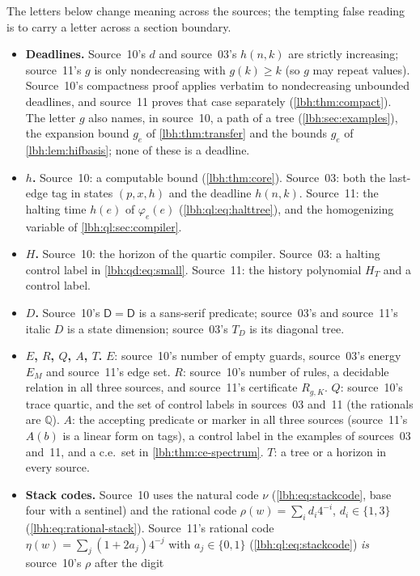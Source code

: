 \documentclass[11pt,letterpaper]{article}
\theoremstyle{definition}
\theoremstyle{remark}
\newcommand{\Q}{\mathbb Q}
\newcommand{\Fixed}{\mathsf{D}}
\newcommand{\1}{\mathbf 1}
\begin{document}
The letters below change meaning across the sources; the tempting false reading is to carry a
letter across a section boundary.
\begin{itemize}
\item \textbf{Deadlines.} Source~10's $d$ and source~03's $h(n,k)$ are strictly increasing;
source~11's $g$ is only nondecreasing with $g(k)\ge k$ (so $g$ may repeat values). Source~10's
compactness proof applies verbatim to nondecreasing unbounded deadlines, and source~11 proves
that case separately (\cref{lbh:thm:compact}). The letter $g$ also names, in source~10, a path of
a tree (\cref{lbh:sec:examples}), the expansion bound $g_e$ of \cref{lbh:thm:transfer} and the
bounds $g_e$ of \cref{lbh:lem:hifbasis}; none of these is a deadline.
\item \textbf{$h$.} Source~10: a computable bound (\cref{lbh:thm:core}). Source~03: both the
last-edge tag in states $(p,x,h)$ and the deadline $h(n,k)$. Source~11: the halting time
$h(e)$ of $\varphi_e(e)$ (\cref{lbh:ql:eq:halttree}), and the homogenizing variable of
\cref{lbh:ql:sec:compiler}.
\item \textbf{$H$.} Source~10: the horizon of the quartic compiler. Source~03: a halting control
label in \cref{lbh:qd:eq:small}. Source~11: the history polynomial $H_T$ and a control label.
\item \textbf{$D$.} Source~10's $\Fixed=\mathsf D$ is a sans-serif predicate; source~03's and
source~11's italic $D$ is a state dimension; source~03's $T_D$ is its diagonal tree.
\item \textbf{$E$, $R$, $Q$, $A$, $T$.} $E$: source~10's number of empty guards, source~03's energy
$E_M$ and source~11's edge set. $R$: source~10's number of rules, a decidable relation in all
three sources, and source~11's certificate $R_{g,K}$. $Q$: source~10's trace quartic, and the set
of control labels in sources~03 and~11 (the rationals are $\Q$). $A$: the accepting predicate or
marker in all three sources (source~11's $A(b)$ is a linear form on tags), a control label in
the examples of sources~03 and~11, and a c.e.\ set in \cref{lbh:thm:ce-spectrum}. $T$: a tree or
a horizon in every source.
\item \textbf{Stack codes.} Source~10 uses the natural code $\nu$ (\cref{lbh:eq:stackcode}, base
four with a sentinel) and the rational code $\rho(w)=\sum_i d_i4^{-i}$, $d_i\in\{1,3\}$
(\cref{lbh:eq:rational-stack}). Source~11's rational code $\eta(w)=\sum_j(1+2a_j)4^{-j}$ with
$a_j\in\{0,1\}$ (\cref{lbh:ql:eq:stackcode}) \emph{is} source~10's $\rho$ after the digit

\end{itemize}
\end{document}
